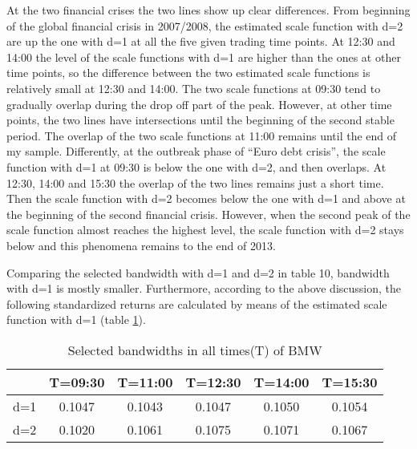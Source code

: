 At the two financial crises the two lines show up clear differences. From beginning of the global financial crisis in 2007/2008, the estimated scale function with d=2 are up the one with d=1 at all the five given trading time points. At 12:30 and 14:00 the level of the scale functions with d=1 are higher than the ones at other time points, so the difference between the two estimated scale functions is relatively small at 12:30 and 14:00. The two scale functions at 09:30 tend to gradually overlap during the drop off part of the peak. However, at other time points, the two lines have intersections until the beginning of the second stable period. The overlap of the two scale functions at 11:00 remains until the end of my sample. Differently, at the outbreak phase of ``Euro debt crisis'', the scale function with d=1 at 09:30 is below the one with d=2, and then overlaps. At 12:30, 14:00 and 15:30 the overlap of the two lines remains just a short time. Then the scale function with d=2 becomes below the one with d=1 and above at the beginning of the second financial crisis. However, when the second peak of the scale function almost reaches the highest level, the scale function with d=2 stays below and this phenomena remains to the end of 2013.

Comparing the selected bandwidth with d=1 and d=2 in table 10, bandwidth with d=1 is mostly smaller. Furthermore, according to the above discussion, the following standardized returns are calculated by means of the estimated scale function with d=1 (table \ref{tab:bandwidthBMW}).

\begin{table}[!h]
 \small
 \centering
 \vspace{2ex} 
\begin{tabular}{c|c|c|c|c|c}
\toprule
    &T=09:30&T=11:00&T=12:30&T=14:00&T=15:30 \\
\midrule
\hline
d=1	& 0.1047	& 0.1043	& 0.1047	& 0.1050	& 0.1054	\\
d=2	& 0.1020	& 0.1061	& 0.1075	& 0.1071	& 0.1067	\\
\bottomrule

\end{tabular}
  \caption{Selected bandwidths in all times(T) of BMW}
  \label{tab:bandwidthBMW}
\end{table}

